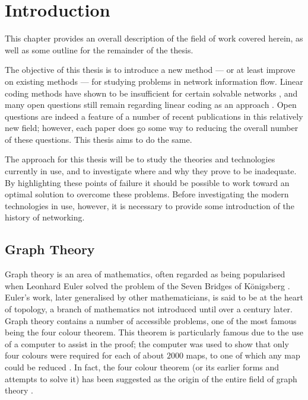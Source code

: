 
\chapter{Introduction}
\label{ch:intro}

This chapter provides an overall description of the field of work covered herein, as well as some outline for the remainder of the thesis.

The objective of this thesis is to introduce a new method --- or at least improve on existing methods --- for studying problems in network information flow. Linear coding methods have shown to be insufficient for certain solvable networks \cite{doug2005}, and many open questions still remain regarding linear coding as an approach \cite{riis2004, cann2006}. Open questions are indeed a feature of a number of recent publications in this relatively new field; however, each paper does go some way to reducing the overall number of these questions. This thesis aims to do the same.

The approach for this thesis will be to study the theories and technologies currently in use, and to investigate where and why they prove to be inadequate. By highlighting these points of failure it should be possible to work toward an optimal solution to overcome these problems. Before investigating the modern technologies in use, however, it is necessary to provide some introduction of the history of networking.

\section{Graph Theory}

Graph theory is an area of mathematics, often regarded as being popularised when Leonhard Euler solved the problem of the Seven Bridges of K{\"o}nigsberg \cite{bigg1986}. Euler's work, later generalised by other mathematicians, is said to be at the heart of topology, a branch of mathematics not introduced until over a century later. Graph theory contains a number of accessible problems, one of the most famous being the four colour theorem. This theorem is particularly famous due to the use of a computer to assist in the proof; the computer was used to show that only four colours were required for each of about $2000$ maps, to one of which any map could be reduced \cite{appe1977}. In fact, the four colour theorem (or its earlier forms and attempts to solve it) has been suggested as the origin of the entire field of graph theory \cite{wils2003}.

